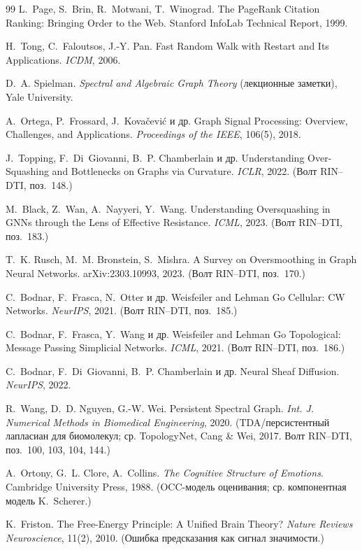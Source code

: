 \begin{thebibliography}{99}
 L.~Page, S.~Brin, R.~Motwani, T.~Winograd.
The PageRank Citation Ranking: Bringing Order to the Web.
Stanford InfoLab Technical Report, 1999.

 H.~Tong, C.~Faloutsos, J.-Y. Pan.
Fast Random Walk with Restart and Its Applications. \emph{ICDM}, 2006.

 D.~A. Spielman.
\emph{Spectral and Algebraic Graph Theory} (лекционные заметки), Yale University.

 A.~Ortega, P.~Frossard, J.~Kova\v{c}evi\'c и др.
Graph Signal Processing: Overview, Challenges, and Applications.
\emph{Proceedings of the IEEE}, 106(5), 2018.

 J.~Topping, F.~Di~Giovanni, B.~P. Chamberlain и др.
Understanding Over-Squashing and Bottlenecks on Graphs via Curvature.
\emph{ICLR}, 2022. (Волт RIN–DTI, поз.~148.)

 M.~Black, Z.~Wan, A.~Nayyeri, Y.~Wang.
Understanding Oversquashing in GNNs through the Lens of Effective Resistance.
\emph{ICML}, 2023. (Волт RIN–DTI, поз.~183.)

 T.~K. Rusch, M.~M. Bronstein, S.~Mishra.
A Survey on Oversmoothing in Graph Neural Networks. arXiv:2303.10993, 2023.
(Волт RIN–DTI, поз.~170.)

 C.~Bodnar, F.~Frasca, N.~Otter и др.
Weisfeiler and Lehman Go Cellular: CW Networks. \emph{NeurIPS}, 2021.
(Волт RIN–DTI, поз.~185.)

 C.~Bodnar, F.~Frasca, Y.~Wang и др.
Weisfeiler and Lehman Go Topological: Message Passing Simplicial Networks.
\emph{ICML}, 2021. (Волт RIN–DTI, поз.~186.)

 C.~Bodnar, F.~Di~Giovanni, B.~P. Chamberlain и др.
Neural Sheaf Diffusion. \emph{NeurIPS}, 2022.

 R.~Wang, D.~D. Nguyen, G.-W. Wei.
Persistent Spectral Graph. \emph{Int. J. Numerical Methods in Biomedical
Engineering}, 2020. (TDA/персистентный лапласиан для биомолекул; ср. TopologyNet,
Cang \& Wei, 2017. Волт RIN–DTI, поз.~100, 103, 104, 144.)

 A.~Ortony, G.~L. Clore, A.~Collins.
\emph{The Cognitive Structure of Emotions}. Cambridge University Press, 1988.
(OCC-модель оценивания; ср. компонентная модель K.~Scherer.)

 K.~Friston. The Free-Energy Principle: A Unified Brain
Theory? \emph{Nature Reviews Neuroscience}, 11(2), 2010. (Ошибка предсказания как
сигнал значимости.)


\end{thebibliography}
